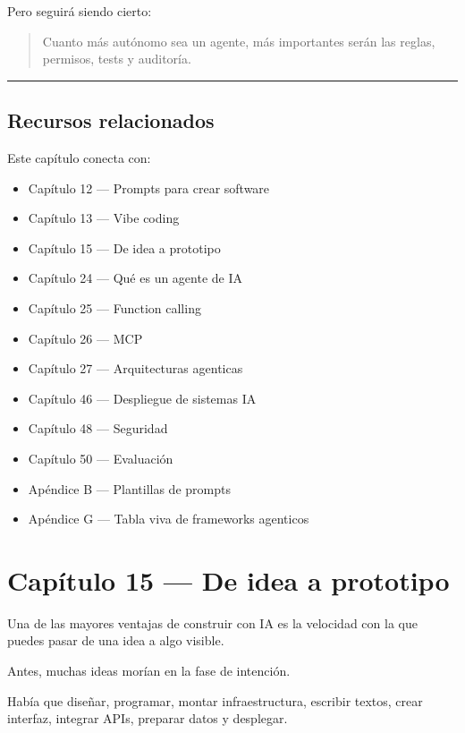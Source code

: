 Pero seguirá siendo cierto:

\begin{quote}
Cuanto más autónomo sea un agente, más importantes serán las reglas,
permisos, tests y auditoría.
\end{quote}

\begin{center}\rule{0.5\linewidth}{0.5pt}\end{center}

\section{Recursos relacionados}\label{recursos-relacionados-13}

Este capítulo conecta con:

\begin{itemize}
\tightlist
\item
  Capítulo 12 --- Prompts para crear software
\item
  Capítulo 13 --- Vibe coding
\item
  Capítulo 15 --- De idea a prototipo
\item
  Capítulo 24 --- Qué es un agente de IA
\item
  Capítulo 25 --- Function calling
\item
  Capítulo 26 --- MCP
\item
  Capítulo 27 --- Arquitecturas agenticas
\item
  Capítulo 46 --- Despliegue de sistemas IA
\item
  Capítulo 48 --- Seguridad
\item
  Capítulo 50 --- Evaluación
\item
  Apéndice B --- Plantillas de prompts
\item
  Apéndice G --- Tabla viva de frameworks agenticos
\end{itemize}

\newpage

\chapter{Capítulo 15 --- De idea a
prototipo}\label{capuxedtulo-15-de-idea-a-prototipo}

Una de las mayores ventajas de construir con IA es la velocidad con la
que puedes pasar de una idea a algo visible.

Antes, muchas ideas morían en la fase de intención.

Había que diseñar, programar, montar infraestructura, escribir textos,
crear interfaz, integrar APIs, preparar datos y desplegar.

